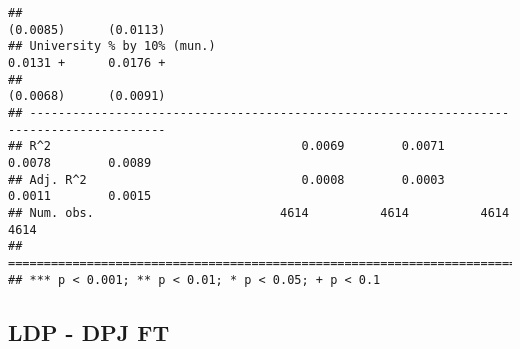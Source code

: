 \documentclass[
]{article}
\begin{document}
\begin{verbatim}
##                                                                  (0.0085)      (0.0113)  
## University % by 10% (mun.)                                        0.0131 +      0.0176 + 
##                                                                  (0.0068)      (0.0091)  
## -----------------------------------------------------------------------------------------
## R^2                                   0.0069        0.0071        0.0078        0.0089   
## Adj. R^2                              0.0008        0.0003        0.0011        0.0015   
## Num. obs.                          4614          4614          4614          4614        
## =========================================================================================
## *** p < 0.001; ** p < 0.01; * p < 0.05; + p < 0.1
\end{verbatim}

\hypertarget{ldp---dpj-ft-1}{%
\subsection{LDP - DPJ FT}\label{ldp---dpj-ft-1}}
\end{document}
